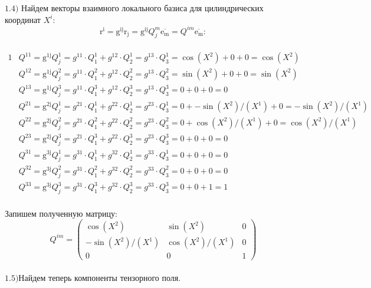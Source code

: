 \documentclass{article}
\begin{document}
$\mathrm{1.4)}$ Найдем векторы взаимного локального базиса для цилиндрических координат $X^i$:\\
\[
\mathrm{r^{i}} = \mathrm{g^{{ij}}}\mathrm{r_j} = \mathrm{g^{{ij}}}Q^m_j\overline{\mathrm{e_m}} = Q^{im}\overline{\mathrm{e_m}}:
\]\\
\begin{alignat*}{1}
  & Q^{11} = \mathrm{g^{1j}}Q^1_j = g^{11} \cdot Q^1_1+ g^{12} \cdot Q^1_2= g^{13} \cdot Q^1_3= \cos(X^2)+ 0+ 0= \cos(X^2) \\
  & Q^{12} = \mathrm{g^{1j}}Q^2_j = g^{11} \cdot Q^2_1+ g^{12} \cdot Q^2_2= g^{13} \cdot Q^2_3= \sin(X^2)+ 0+ 0= \sin(X^2) \\
  & Q^{13} = \mathrm{g^{1j}}Q^3_j = g^{11} \cdot Q^3_1+ g^{12} \cdot Q^3_2= g^{13} \cdot Q^3_3= 0+ 0+ 0= 0 \\
  & Q^{21} = \mathrm{g^{2j}}Q^1_j = g^{21} \cdot Q^1_1+ g^{22} \cdot Q^1_2= g^{23} \cdot Q^1_3= 0+ -\sin(X^2)/(X^1)+ 0= -\sin(X^2)/(X^1) \\
  & Q^{22} = \mathrm{g^{2j}}Q^2_j = g^{21} \cdot Q^2_1+ g^{22} \cdot Q^2_2= g^{23} \cdot Q^2_3= 0+ \cos(X^2)/(X^1)+ 0= \cos(X^2)/(X^1) \\
  & Q^{23} = \mathrm{g^{2j}}Q^3_j = g^{21} \cdot Q^3_1+ g^{22} \cdot Q^3_2= g^{23} \cdot Q^3_3= 0+ 0+ 0= 0 \\
  & Q^{31} = \mathrm{g^{3j}}Q^1_j = g^{31} \cdot Q^1_1+ g^{32} \cdot Q^1_2= g^{33} \cdot Q^1_3= 0+ 0+ 0= 0 \\
  & Q^{32} = \mathrm{g^{3j}}Q^2_j = g^{31} \cdot Q^2_1+ g^{32} \cdot Q^2_2= g^{33} \cdot Q^2_3= 0+ 0+ 0= 0 \\
  & Q^{33} = \mathrm{g^{3j}}Q^3_j = g^{31} \cdot Q^3_1+ g^{32} \cdot Q^3_2= g^{33} \cdot Q^3_3= 0+ 0+ 1= 1 
\end{alignat*}\\
Запишем полученную матрицу:\\
\[
Q^{im}=\begin{pmatrix}
	\cos(X^2) & \sin(X^2) & 0\\
	-\sin(X^2)/(X^1) & \cos(X^2)/(X^1) & 0\\
	0 & 0 & 1
\end{pmatrix}
\]\\
$\mathrm{1.5)}$Найдем теперь компоненты тензорного поля.\\
\vspace*{-0cm} %
\end{document}
